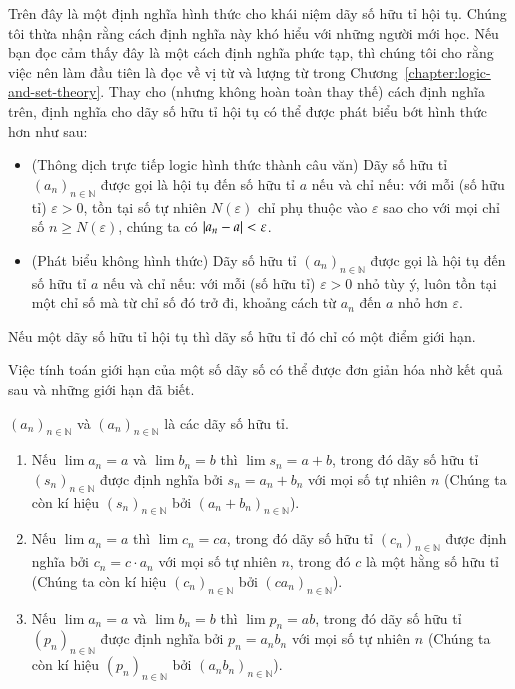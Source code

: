 Trên đây là một định nghĩa hình thức cho khái niệm dãy số hữu tỉ hội tụ. Chúng tôi thừa nhận rằng cách định nghĩa này khó hiểu với những người mới học. Nếu bạn đọc cảm thấy đây là một cách định nghĩa phức tạp, thì chúng tôi cho rằng việc nên làm đầu tiên là đọc về vị từ và lượng từ trong Chương~\ref{chapter:logic-and-set-theory}. Thay cho (nhưng không hoàn toàn thay thế) cách định nghĩa trên, định nghĩa cho dãy số hữu tỉ hội tụ có thể được phát biểu bớt hình thức hơn như sau:
\begin{itemize}
	\item (Thông dịch trực tiếp logic hình thức thành câu văn) Dãy số hữu tỉ ${(a_{n})}_{n\in\mathbb{N}}$ được gọi là hội tụ đến số hữu tỉ $a$ nếu và chỉ nếu: với mỗi (số hữu tỉ) $\varepsilon > 0$, tồn tại số tự nhiên $N(\varepsilon)$ chỉ phụ thuộc vào $\varepsilon$ sao cho với mọi chỉ số $n\geq N(\varepsilon)$, chúng ta có $\left\vert{a_{n} - a}\right\vert < \varepsilon$.
	\item (Phát biểu không hình thức) Dãy số hữu tỉ ${(a_{n})}_{n\in\mathbb{N}}$ được gọi là hội tụ đến số hữu tỉ $a$ nếu và chỉ nếu: với mỗi (số hữu tỉ) $\varepsilon > 0$ nhỏ tùy ý, luôn tồn tại một chỉ số mà từ chỉ số đó trở đi, khoảng cách từ $a_{n}$ đến $a$ nhỏ hơn $\varepsilon$.
\end{itemize}

\begin{theorem}\label{theorem:uniqueness-of-limit-points-of-convergence-rational-sequences}
	Nếu một dãy số hữu tỉ hội tụ thì dãy số hữu tỉ đó chỉ có một điểm giới hạn.
\end{theorem}

Việc tính toán giới hạn của một số dãy số có thể được đơn giản hóa nhờ kết quả sau và những giới hạn đã biết.
\begin{proposition}\label{proposition:limits-of-sum-and-product}
	${(a_{n})}_{n\in\mathbb{N}}$ và ${(a_{n})}_{n\in\mathbb{N}}$ là các dãy số hữu tỉ.
	\begin{enumerate}[label={(\roman*)}]
		\item Nếu $\lim a_{n} = a$ và $\lim b_{n} = b$ thì $\lim s_{n} = a + b$, trong đó dãy số hữu tỉ ${(s_{n})}_{n\in\mathbb{N}}$ được định nghĩa bởi $s_{n} = a_{n} + b_{n}$ với mọi số tự nhiên $n$ (Chúng ta còn kí hiệu ${(s_{n})}_{n\in\mathbb{N}}$ bởi ${(a_{n} + b_{n})}_{n\in\mathbb{N}}$).
		\item Nếu $\lim a_{n} = a$ thì $\lim c_{n} = ca$, trong đó dãy số hữu tỉ ${(c_{n})}_{n\in\mathbb{N}}$ được định nghĩa bởi $c_{n} = c\cdot a_{n}$ với mọi số tự nhiên $n$, trong đó $c$ là một hằng số hữu tỉ (Chúng ta còn kí hiệu ${(c_{n})}_{n\in\mathbb{N}}$ bởi ${(ca_{n})}_{n\in\mathbb{N}}$).
		\item Nếu $\lim a_{n} = a$ và $\lim b_{n} = b$ thì $\lim p_{n} = ab$, trong đó dãy số hữu tỉ ${(p_{n})}_{n\in\mathbb{N}}$ được định nghĩa bởi $p_{n} = a_{n}b_{n}$ với mọi số tự nhiên $n$ (Chúng ta còn kí hiệu ${(p_{n})}_{n\in\mathbb{N}}$ bởi ${(a_{n}b_{n})}_{n\in\mathbb{N}}$).
	\end{enumerate}
\end{proposition}


